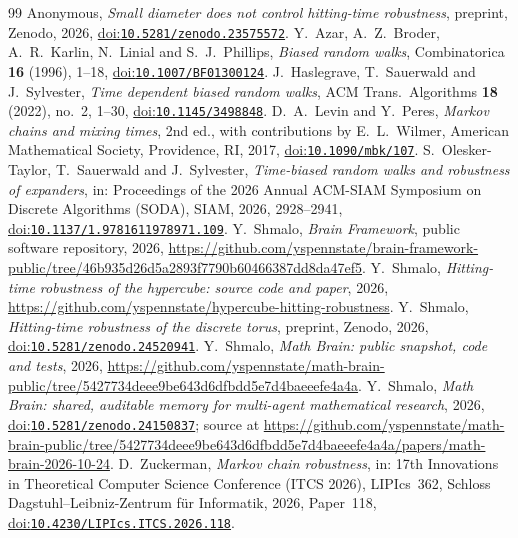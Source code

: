 \documentclass[11pt]{amsart}
\theoremstyle{remark}
\newcommand{\doi}[1]{\href{https://doi.org/#1}{doi:\nolinkurl{#1}}}
\begin{document}
\begin{thebibliography}{99}
 Anonymous, \emph{Small diameter does not control hitting-time robustness}, preprint, Zenodo, 2026, \doi{10.5281/zenodo.23575572}.
 Y.~Azar, A.~Z.~Broder, A.~R.~Karlin, N.~Linial and S.~J.~Phillips, \emph{Biased random walks},
Combinatorica \textbf{16} (1996), 1--18, \doi{10.1007/BF01300124}.
 J.~Haslegrave, T.~Sauerwald and J.~Sylvester, \emph{Time dependent biased random walks}, ACM Trans.\ Algorithms \textbf{18} (2022), no.~2, 1--30,
\doi{10.1145/3498848}.
 D.~A.~Levin and Y.~Peres, \emph{Markov chains and mixing times}, 2nd ed., with contributions by
E.~L.~Wilmer, American Mathematical Society, Providence, RI, 2017, \doi{10.1090/mbk/107}.
 S.~Olesker-Taylor, T.~Sauerwald and J.~Sylvester, \emph{Time-biased random walks and robustness of
expanders}, in: Proceedings of the 2026 Annual ACM-SIAM Symposium on Discrete Algorithms (SODA), SIAM, 2026,
2928--2941, \doi{10.1137/1.9781611978971.109}.
 Y.~Shmalo, \emph{Brain Framework}, public software repository, 2026,
\url{https://github.com/yspennstate/brain-framework-public/tree/46b935d26d5a2893f7790b60466387dd8da47ef5}.
 Y.~Shmalo, \emph{Hitting-time robustness of the hypercube: source code and paper}, 2026,
\url{https://github.com/yspennstate/hypercube-hitting-robustness}.
 Y.~Shmalo, \emph{Hitting-time robustness of the discrete torus}, preprint, Zenodo, 2026,
\doi{10.5281/zenodo.24520941}.
 Y.~Shmalo, \emph{Math Brain: public snapshot, code and tests}, 2026,
\url{https://github.com/yspennstate/math-brain-public/tree/5427734deee9be643d6dfbdd5e7d4baeeefe4a4a}.
 Y.~Shmalo, \emph{Math Brain: shared, auditable memory for multi-agent mathematical research},
2026, \doi{10.5281/zenodo.24150837}; source at
\url{https://github.com/yspennstate/math-brain-public/tree/5427734deee9be643d6dfbdd5e7d4baeeefe4a4a/papers/math-brain-2026-10-24}.
 D.~Zuckerman, \emph{Markov chain robustness}, in: 17th Innovations in Theoretical Computer Science
Conference (ITCS 2026), LIPIcs~362, Schloss Dagstuhl--Leibniz-Zentrum f\"ur Informatik, 2026, Paper~118,
\doi{10.4230/LIPIcs.ITCS.2026.118}.
\end{thebibliography}
\end{document}
